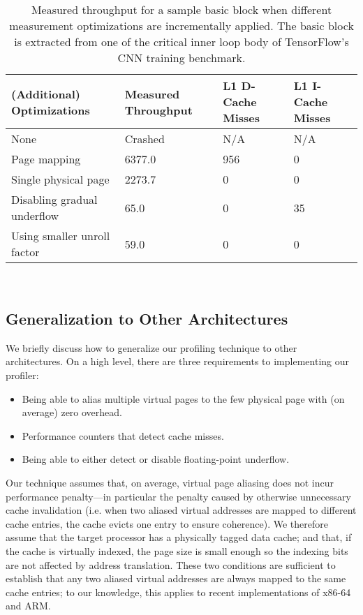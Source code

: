 \begin{table}
\begin{tabular}{
|p{}|p{}|p{}|p{}|}
\hline \textbf{(Additional) Optimizations} &
\textbf{Measured Throughput} &
\textbf{L1 D-Cache Misses} &
\textbf{L1 I-Cache Misses} \\

\hline
None & Crashed & N/A & N/A \\

\hline
Page mapping & 6377.0 & 956 & 0 \\

\hline
Single physical page & 2273.7 & 0 & 0 \\

\hline
Disabling gradual underflow & 65.0 & 0 & 35 \\

\hline
Using smaller unroll factor & 59.0 & 0 & 0\\

\hline
\end{tabular}
\\
\caption{Measured throughput for a sample basic block when
different measurement optimizations are incrementally applied.
The basic block is extracted from one of the critical 
inner loop body of TensorFlow\cite{tensorflow}'s CNN training benchmark.}
\label{tab:ablation}
\end{table}

\subsection{Generalization to Other Architectures}\label{sec:generalization}
We briefly discuss how to generalize our profiling technique to other architectures.
On a high level, there are three requirements to implementing our profiler:
\begin{itemize}
    \item Being able to alias multiple virtual pages to the few physical page with 
    (on average) zero overhead.
    
    \item Performance counters that detect cache misses.
    
    \item Being able to either detect or disable floating-point underflow.
\end{itemize}

Our technique assumes that, on average, virtual page aliasing does not incur performance penalty---in particular the penalty 
caused by otherwise unnecessary cache invalidation 
(i.e. when two aliased virtual addresses are mapped to different cache entries,
the cache evicts one entry to ensure coherence).
We therefore assume that the target processor has a physically tagged 
data cache;
and that, if the cache is virtually indexed,
the page size is small enough so the indexing bits are not affected by address translation.
These two conditions are sufficient to establish that any two aliased virtual addresses
are always mapped to the same cache entries;
to our knowledge, this applies to recent implementations of x86-64 and ARM.